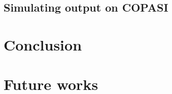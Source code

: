 \documentclass[12pt]{article}
\begin{document}
    

\subsection{Simulating output on COPASI}
    \lipsum[1]

\section{Conclusion}
    \lipsum[1]
    
\section{Future works}
    \lipsum[1]



\end{document}
